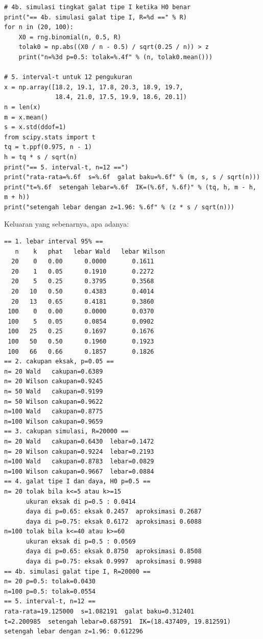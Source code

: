 \begin{lab}
\begin{verbatim}
# 4b. simulasi tingkat galat tipe I ketika H0 benar
print("== 4b. simulasi galat tipe I, R=%d ==" % R)
for n in (20, 100):
    X0 = rng.binomial(n, 0.5, R)
    tolak0 = np.abs((X0 / n - 0.5) / sqrt(0.25 / n)) > z
    print("n=%3d p=0.5: tolak=%.4f" % (n, tolak0.mean()))

# 5. interval-t untuk 12 pengukuran
x = np.array([18.2, 19.1, 17.8, 20.3, 18.9, 19.7,
              18.4, 21.0, 17.5, 19.9, 18.6, 20.1])
n = len(x)
m = x.mean()
s = x.std(ddof=1)
from scipy.stats import t
tq = t.ppf(0.975, n - 1)
h = tq * s / sqrt(n)
print("== 5. interval-t, n=12 ==")
print("rata-rata=%.6f  s=%.6f  galat baku=%.6f" % (m, s, s / sqrt(n)))
print("t=%.6f  setengah lebar=%.6f  IK=(%.6f, %.6f)" % (tq, h, m - h, m + h))
print("setengah lebar dengan z=1.96: %.6f" % (z * s / sqrt(n)))
\end{verbatim}
\end{lab}

Keluaran yang sebenarnya, apa adanya:

\begin{verbatim}
== 1. lebar interval 95% ==
   n    k   phat   lebar Wald   lebar Wilson
  20    0   0.00      0.0000       0.1611
  20    1   0.05      0.1910       0.2272
  20    5   0.25      0.3795       0.3568
  20   10   0.50      0.4383       0.4014
  20   13   0.65      0.4181       0.3860
 100    0   0.00      0.0000       0.0370
 100    5   0.05      0.0854       0.0902
 100   25   0.25      0.1697       0.1676
 100   50   0.50      0.1960       0.1923
 100   66   0.66      0.1857       0.1826
== 2. cakupan eksak, p=0.05 ==
n= 20 Wald   cakupan=0.6389
n= 20 Wilson cakupan=0.9245
n= 50 Wald   cakupan=0.9199
n= 50 Wilson cakupan=0.9622
n=100 Wald   cakupan=0.8775
n=100 Wilson cakupan=0.9659
== 3. cakupan simulasi, R=20000 ==
n= 20 Wald   cakupan=0.6430  lebar=0.1472
n= 20 Wilson cakupan=0.9224  lebar=0.2193
n=100 Wald   cakupan=0.8783  lebar=0.0829
n=100 Wilson cakupan=0.9667  lebar=0.0884
== 4. galat tipe I dan daya, H0 p=0.5 ==
n= 20 tolak bila k<=5 atau k>=15
      ukuran eksak di p=0.5 : 0.0414
      daya di p=0.65: eksak 0.2457  aproksimasi 0.2687
      daya di p=0.75: eksak 0.6172  aproksimasi 0.6088
n=100 tolak bila k<=40 atau k>=60
      ukuran eksak di p=0.5 : 0.0569
      daya di p=0.65: eksak 0.8750  aproksimasi 0.8508
      daya di p=0.75: eksak 0.9997  aproksimasi 0.9988
== 4b. simulasi galat tipe I, R=20000 ==
n= 20 p=0.5: tolak=0.0430
n=100 p=0.5: tolak=0.0554
== 5. interval-t, n=12 ==
rata-rata=19.125000  s=1.082191  galat baku=0.312401
t=2.200985  setengah lebar=0.687591  IK=(18.437409, 19.812591)
setengah lebar dengan z=1.96: 0.612296
\end{verbatim}

